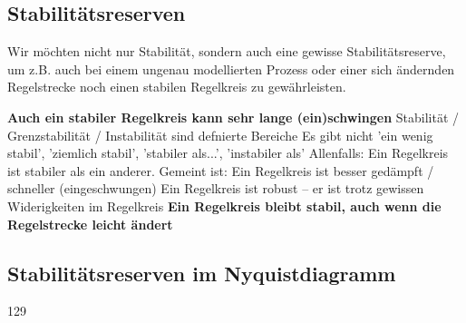 \subsection{Stabilitätsreserven}

Wir möchten nicht nur Stabilität, sondern auch eine gewisse Stabilitätsreserve, um z.B. auch bei einem ungenau
modellierten Prozess oder einer sich ändernden Regelstrecke noch einen stabilen Regelkreis zu gewährleisten. 
\vspace{0.2cm}
\begin{outline}
    \1 \textbf{Auch ein stabiler Regelkreis kann sehr lange (ein)schwingen}
    \1 Stabilität / Grenzstabilität / Instabilität sind defnierte Bereiche
        \2 Es gibt nicht 'ein wenig stabil', 'ziemlich stabil', 'stabiler als...', 'instabiler als'
    \1 Allenfalls: Ein Regelkreis ist stabiler als ein anderer. Gemeint ist:
        \2 Ein Regelkreis ist besser gedämpft / schneller (eingeschwungen)
        \2 Ein Regelkreis ist robust -- er ist trotz gewissen Widerigkeiten im Regelkreis
        \2 \textbf{Ein Regelkreis bleibt stabil, auch wenn die Regelstrecke leicht ändert}
\end{outline}


\subsection{Stabilitätsreserven im Nyquistdiagramm}{129}


